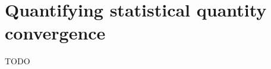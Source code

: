 \documentclass[letterpaper,11pt,nointlimits,reqno,draft]{amsbook}
\newcommand{\Mach}[1][]{\ensuremath{\mbox{Ma}_{#1}}}
\begin{document}
\section{Quantifying statistical quantity convergence}
\label{sec:quantconvergence}

TODO


\backmatter
\newcommand*{\doi}[1]{\href{http://dx.doi.org/\detokenize{#1}}{doi: #1}}




\end{document}
